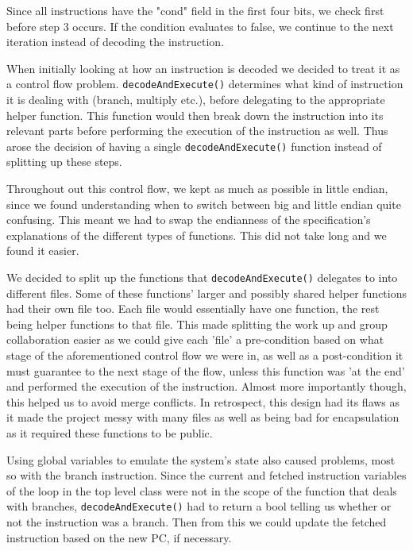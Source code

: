 \documentclass[a4paper]{article}
\begin{document}
Since all instructions have the "cond" field in the first four bits, we check first before step 3 occurs. If the condition evaluates to false, we continue to the next iteration instead of decoding the instruction.

When initially looking at how an instruction is decoded we decided to treat it as a control flow problem. \texttt{decodeAndExecute()} determines what kind of instruction it is dealing with (branch, multiply etc.), before delegating to the appropriate helper function. This function would then break down the instruction into its relevant parts before performing the execution of the instruction as well. Thus arose the decision of having a single \texttt{decodeAndExecute()} function instead of splitting up these steps. 

Throughout out this control flow, we kept as much as possible in little endian, since we found understanding when to switch between big and little endian quite confusing. This meant we had to swap the endianness of the specification’s explanations of the different types of functions. This did not take long and we found it easier.

We decided to split up the functions that \texttt{decodeAndExecute()} delegates to into different files. Some of these functions' larger and possibly shared helper functions had their own file too. Each file would essentially have one function, the rest being helper functions to that file. This made splitting the work up and group collaboration easier as we could give each 'file' a pre-condition based on what stage of the aforementioned control flow we were in, as well as a post-condition it must guarantee to the next stage of the flow, unless this function was 'at the end' and performed the execution of the instruction. Almost more importantly though, this helped us to avoid merge conflicts. In retrospect, this design had its flaws as it made the project messy with many files as well as being bad for encapsulation as it required these functions to be public.

Using global variables to emulate the system's state also caused problems, most so with the branch instruction. Since the current and fetched instruction variables of the loop in the top level class were not in the scope of the function that deals with branches, \texttt{decodeAndExecute()} had to return a bool telling us whether or not the instruction was a branch.  Then from this we could update the fetched instruction based on the new PC, if necessary.
\end{document}
